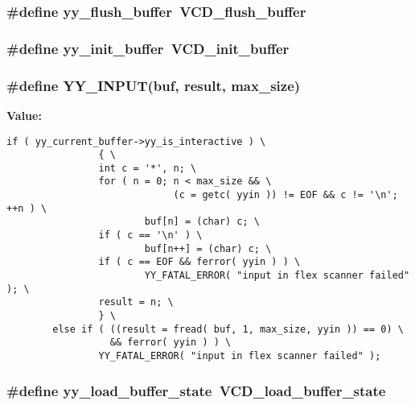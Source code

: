 \subsubsection{\setlength{\rightskip}{0pt plus 5cm}\#define yy\_\-flush\_\-buffer\ VCD\_\-flush\_\-buffer}\label{vcd__lexer_8c_a7}


\subsubsection{\setlength{\rightskip}{0pt plus 5cm}\#define yy\_\-init\_\-buffer\ VCD\_\-init\_\-buffer}\label{vcd__lexer_8c_a6}


\subsubsection{\setlength{\rightskip}{0pt plus 5cm}\#define YY\_\-INPUT(buf, result, max\_\-size)}\label{vcd__lexer_8c_a70}


{\bf Value:}

\footnotesize\begin{verbatim}if ( yy_current_buffer->yy_is_interactive ) \
                { \
                int c = '*', n; \
                for ( n = 0; n < max_size && \
                             (c = getc( yyin )) != EOF && c != '\n'; ++n ) \
                        buf[n] = (char) c; \
                if ( c == '\n' ) \
                        buf[n++] = (char) c; \
                if ( c == EOF && ferror( yyin ) ) \
                        YY_FATAL_ERROR( "input in flex scanner failed" ); \
                result = n; \
                } \
        else if ( ((result = fread( buf, 1, max_size, yyin )) == 0) \
                  && ferror( yyin ) ) \
                YY_FATAL_ERROR( "input in flex scanner failed" );\end{verbatim}\normalsize 
{}
\subsubsection{\setlength{\rightskip}{0pt plus 5cm}\#define yy\_\-load\_\-buffer\_\-state\ VCD\_\-load\_\-buffer\_\-state}\label{vcd__lexer_8c_a8}


